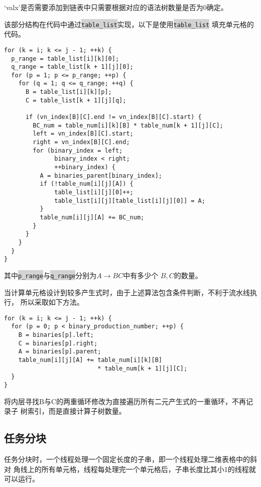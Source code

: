 \documentclass{ctexart}
\newcommand{\mdcode}[1]{\texttt{\colorbox{lightgray}{#1}}}
\begin{document}
`valx'是否需要添加到链表中只需要根据对应的语法树数量是否为0确定。

该部分结构在代码中通过\mdcode{table\_list}实现，以下是使用\mdcode{table\_list}
填充单元格的代码。

\begin{verbatim}
for (k = i; k <= j - 1; ++k) {
  p_range = table_list[i][k][0];
  q_range = table_list[k + 1][j][0];
  for (p = 1; p <= p_range; ++p) {
    for (q = 1; q <= q_range; ++q) {
      B = table_list[i][k][p];
      C = table_list[k + 1][j][q];

      if (vn_index[B][C].end != vn_index[B][C].start) {
        BC_num = table_num[i][k][B] * table_num[k + 1][j][C];
        left = vn_index[B][C].start;
        right = vn_index[B][C].end;
        for (binary_index = left; 
              binary_index < right;
              ++binary_index) {
          A = binaries_parent[binary_index];
          if (!table_num[i][j][A]) {
              table_list[i][j][0]++;
              table_list[i][j][table_list[i][j][0]] = A;
          }
          table_num[i][j][A] += BC_num;
        }
      }
    }
  }
}
\end{verbatim}

其中\mdcode{p\_range}与\mdcode{q\_range}分别为$A\rightarrow BC$中有多少个
$B,C$的数量。

当计算单元格设计到较多产生式时，由于上述算法包含条件判断，不利于流水线执行，
所以采取如下方法。

\begin{lstlisting}[caption={单元格计算-1}, label={lst:code1}]
for (k = i; k <= j - 1; ++k) {
  for (p = 0; p < binary_production_number; ++p) {
    B = binaries[p].left;
    C = binaries[p].right;
    A = binaries[p].parent;
    table_num[i][j][A] += table_num[i][k][B] 
                          * table_num[k + 1][j][C];
  }
}
\end{lstlisting}

将内层寻找B与C的两重循环修改为直接遍历所有二元产生式的一重循环，不再记录子
树索引，而是直接计算子树数量。

\subsection{任务分块}

任务分块时，一个线程处理一个固定长度的子串，即一个线程处理二维表格中的斜对
角线上的所有单元格，线程每处理完一个单元格后，子串长度比其小1的线程就可以运行。
\end{document}
